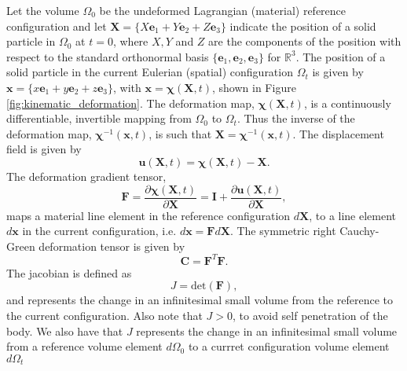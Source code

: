 Let the volume $\Omega_{0}$ be the undeformed Lagrangian (material) reference configuration and let $\boldsymbol{X}=\lbrace X\boldsymbol{e}_{1} +Y\boldsymbol{e}_{2} + Z\boldsymbol{e}_{3} \rbrace $ indicate the position of a solid particle in $\Omega_{0}$ at $t=0$, where $X,Y$ and $Z$ are the components of the position with respect to the standard orthonormal basis $\lbrace \boldsymbol{e}_{1}  ,\boldsymbol{e}_{2}  , \boldsymbol{e}_{3}  \rbrace $ for $\mathbb{R}^{3}$. The position of a solid particle in the current Eulerian (spatial) configuration $\Omega_{t}$ is given by $\boldsymbol{x}=\lbrace x\boldsymbol{e}_{1} +y\boldsymbol{e}_{2} + z\boldsymbol{e}_{3} \rbrace$, with  $\boldsymbol{x}=\boldsymbol\chi(\boldsymbol{X},t)$, shown in Figure \ref{fig:kinematic_deformation}. The deformation map, $\boldsymbol\chi(\boldsymbol{X},t)$, is a continuously
differentiable, invertible mapping from $\Omega_{0}$ to $\Omega_{t}$. Thus the inverse of the deformation map, $\boldsymbol\chi^{-1}(\boldsymbol{x},t)$, is such that $\boldsymbol{X}=\boldsymbol\chi^{-1}(\boldsymbol{x},t)$. The displacement field is given by
\begin{equation}
 \boldsymbol{u}(\boldsymbol{X},t)=\boldsymbol\chi(\boldsymbol{X},t)-\boldsymbol{X}.
 \label{eqn:displacement}
\end{equation}
The deformation gradient tensor,
\begin{equation}
 \boldsymbol{F}=\frac{\partial \boldsymbol\chi(\boldsymbol{X},t)}{\partial \boldsymbol{X}}=\boldsymbol{I}+\frac{\partial \boldsymbol{u}(\boldsymbol{X},t)}{\partial \boldsymbol{X}} ,
 \label{eqn:deformation_gradient}
\end{equation}
maps a material line element in the reference configuration ${d}\boldsymbol{X}$, to a line element ${d}\boldsymbol{x}$ in the current configuration, i.e. ${d}\boldsymbol{x}=\boldsymbol{F}{d}\boldsymbol{X}$. The symmetric right Cauchy-Green deformation tensor is given by
\begin{equation}
\boldsymbol{C}={\boldsymbol{F}}^{T}{\boldsymbol{F}}.
\label{eqn:right_cg_tensor}
\end{equation}
The jacobian is defined as
\begin{equation}
 J=\mbox{det}(\boldsymbol{F}),
 \label{eqn:jacobian}
\end{equation}
and represents the change in an infinitesimal small volume from the reference to the current configuration. Also note that $J > 0$, to avoid self penetration of the body. We also have that $J$ represents the change in an infinitesimal small volume from a reference volume element $d \Omega_{0}$ to a currret configuration  volume element $d \Omega_{t}$
